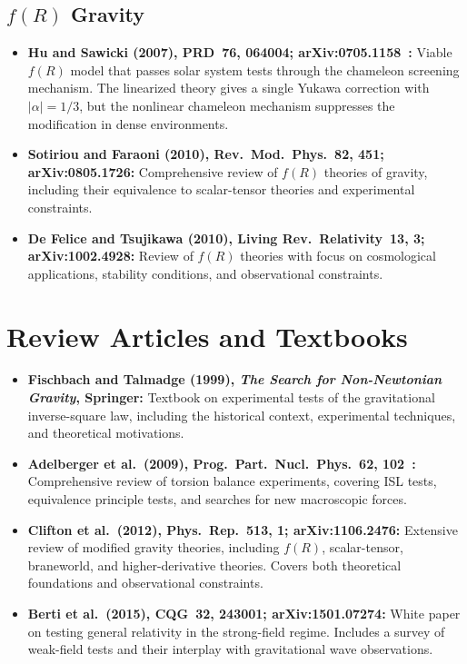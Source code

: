 \documentclass[11pt,a4paper]{article}
\begin{document}
\subsection{$f(R)$ Gravity}

\begin{itemize}[leftmargin=2em]
  \item \textbf{Hu and Sawicki (2007), PRD~76, 064004;
    arXiv:0705.1158~\cite{hu2007}:}
    Viable $f(R)$ model that passes solar system tests through the
    chameleon screening mechanism. The linearized theory gives a single
    Yukawa correction with $|\alpha| = 1/3$, but the nonlinear chameleon
    mechanism suppresses the modification in dense environments.

  \item \textbf{Sotiriou and Faraoni (2010), Rev.\ Mod.\ Phys.~82, 451;
    arXiv:0805.1726:}
    Comprehensive review of $f(R)$ theories of gravity, including their
    equivalence to scalar-tensor theories and experimental constraints.

  \item \textbf{De Felice and Tsujikawa (2010),
    Living Rev.\ Relativity~13, 3; arXiv:1002.4928:}
    Review of $f(R)$ theories with focus on cosmological applications,
    stability conditions, and observational constraints.
\end{itemize}

\section{Review Articles and Textbooks}
\label{sec:reviews}

\begin{itemize}[leftmargin=2em]
  \item \textbf{Fischbach and Talmadge (1999),
    \textit{The Search for Non-Newtonian Gravity}, Springer:}
    Textbook on experimental tests of the gravitational inverse-square law,
    including the historical context, experimental techniques, and theoretical
    motivations.

  \item \textbf{Adelberger et al.\ (2009), Prog.\ Part.\ Nucl.\ Phys.~62,
    102~\cite{adelberger2009}:}
    Comprehensive review of torsion balance experiments, covering ISL tests,
    equivalence principle tests, and searches for new macroscopic forces.

  \item \textbf{Clifton et al.\ (2012), Phys.\ Rep.~513, 1;
    arXiv:1106.2476:}
    Extensive review of modified gravity theories, including $f(R)$,
    scalar-tensor, braneworld, and higher-derivative theories. Covers both
    theoretical foundations and observational constraints.

  \item \textbf{Berti et al.\ (2015), CQG~32, 243001; arXiv:1501.07274:}
    White paper on testing general relativity in the strong-field regime.
    Includes a survey of weak-field tests and their interplay with
    gravitational wave observations.
\end{itemize}
\end{document}
